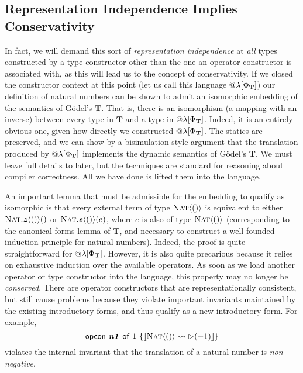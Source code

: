 \subsection{Representation Independence Implies Conservativity}\label{repind}
In fact, we will demand this sort of \emph{representation independence} at \emph{all} types constructed by a type constructor other than the one an operator constructor is associated with, as this will lead us to the concept of conservativity. If we closed the constructor context at this point (let us call this language @$\lambda[\fvalCtx_{\mathbf{T}}]$) our definition of natural numbers can be shown to admit an isomorphic embedding of the semantics of G\"odel's $\mathbf{T}$. That is, there is an isomorphism (a mapping with an inverse) between every type in $\mathbf{T}$ and a type in @$\lambda[\fvalCtx_{\mathbf{T}}]$. Indeed, it is an entirely obvious one, given how directly we constructed @$\lambda[\fvalCtx_{\mathbf{T}}]$. The statics are  preserved, and we can show by a bisimulation style argument that the translation produced by @$\lambda[\fvalCtx_{\mathbf{T}}]$ implements the dynamic semantics of G\"odel's $\mathbf{T}$. We must leave full details to later, but the techniques are  standard for reasoning about compiler correctness. All we have done is lifted them into the language.%

An important lemma that must be admissible for the embedding to qualify as isomorphic is that every  external term of type $\ttype{Nat}{\tunit}$ is equivalent to either $\eop{Nat}{z}{\tunit}{ }$ or $\eop{Nat}{s}{\tunit}{e}$, where $e$ is also of type $\ttype{Nat}{\tunit}$ (corresponding to the canonical forms lemma of $\mathbf{T}$, and necessary to construct a well-founded induction principle for natural numbers). 
Indeed, the proof is quite straightforward for @$\lambda[\fvalCtx_{\mathbf{T}}]$. However, it is also quite precarious because it relies on exhaustive induction over the available operators. As soon as we load another operator or type constructor into the language, this property may no longer be \emph{conserved}. There are operator constructors that are representationally consistent, but still cause problems because they violate important invariants maintained by the existing introductory forms, and thus qualify as a new introductory form. For example, $$\tops{n1}{\kunit}{i}{a}{\tden{\titerm{-1}}{\ttype{Nat}{\tunit}}}$$ violates the internal invariant that the translation of a natural number is \emph{non-negative}.

